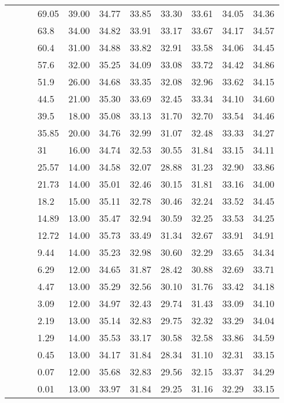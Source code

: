 \begin{longtable}{llllrrrrrrr}
   &  &  & 69.05 & 39.00 & 34.77 & 33.85 & 33.30 & 33.61 & 34.05 & 34.36 \\ 
   &  &  & 63.8 & 34.00 & 34.82 & 33.91 & 33.17 & 33.67 & 34.17 & 34.57 \\ 
   &  &  & 60.4 & 31.00 & 34.88 & 33.82 & 32.91 & 33.58 & 34.06 & 34.45 \\ 
   &  &  & 57.6 & 32.00 & 35.25 & 34.09 & 33.08 & 33.72 & 34.42 & 34.86 \\ 
   &  &  & 51.9 & 26.00 & 34.68 & 33.35 & 32.08 & 32.96 & 33.62 & 34.15 \\ 
   &  &  & 44.5 & 21.00 & 35.30 & 33.69 & 32.45 & 33.34 & 34.10 & 34.60 \\ 
   &  &  & 39.5 & 18.00 & 35.08 & 33.13 & 31.70 & 32.70 & 33.54 & 34.46 \\ 
   &  &  & 35.85 & 20.00 & 34.76 & 32.99 & 31.07 & 32.48 & 33.33 & 34.27 \\ 
   &  &  & 31 & 16.00 & 34.74 & 32.53 & 30.55 & 31.84 & 33.15 & 34.11 \\ 
   &  &  & 25.57 & 14.00 & 34.58 & 32.07 & 28.88 & 31.23 & 32.90 & 33.86 \\ 
   &  &  & 21.73 & 14.00 & 35.01 & 32.46 & 30.15 & 31.81 & 33.16 & 34.00 \\ 
   &  &  & 18.2 & 15.00 & 35.11 & 32.78 & 30.46 & 32.24 & 33.52 & 34.45 \\ 
   &  &  & 14.89 & 13.00 & 35.47 & 32.94 & 30.59 & 32.25 & 33.53 & 34.25 \\ 
   &  &  & 12.72 & 14.00 & 35.73 & 33.49 & 31.34 & 32.67 & 33.91 & 34.91 \\ 
   &  &  & 9.44 & 14.00 & 35.23 & 32.98 & 30.60 & 32.29 & 33.65 & 34.34 \\ 
   &  &  & 6.29 & 12.00 & 34.65 & 31.87 & 28.42 & 30.88 & 32.69 & 33.71 \\ 
   &  &  & 4.47 & 13.00 & 35.29 & 32.56 & 30.10 & 31.76 & 33.42 & 34.18 \\ 
   &  &  & 3.09 & 12.00 & 34.97 & 32.43 & 29.74 & 31.43 & 33.09 & 34.10 \\ 
   &  &  & 2.19 & 13.00 & 35.14 & 32.83 & 29.75 & 32.32 & 33.29 & 34.04 \\ 
   &  &  & 1.29 & 14.00 & 35.53 & 33.17 & 30.58 & 32.58 & 33.86 & 34.59 \\ 
   &  &  & 0.45 & 13.00 & 34.17 & 31.84 & 28.34 & 31.10 & 32.31 & 33.15 \\ 
   &  &  & 0.07 & 12.00 & 35.68 & 32.83 & 29.56 & 32.15 & 33.37 & 34.29 \\ 
   &  &  & 0.01 & 13.00 & 33.97 & 31.84 & 29.25 & 31.16 & 32.29 & 33.15 \\ 

\end{longtable}
